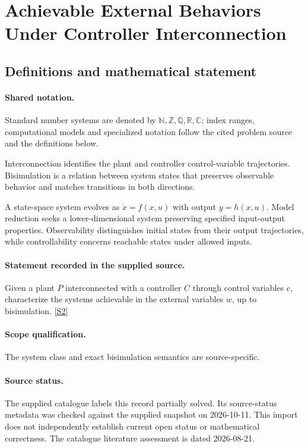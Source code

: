\documentclass[11pt]{article}
\newcommand{\sref}[2]{\hyperlink{source:#1:#2}{[S#2]}}
\begin{document}
\section{Achievable External Behaviors Under Controller Interconnection}\label{statement}

\subsection{Definitions and mathematical statement}

\paragraph{Shared notation.}Standard number systems are denoted by $\mathbb N,\mathbb Z,\mathbb Q,\mathbb R,\mathbb C$; index ranges, computational models and specialized notation follow the cited problem source and the definitions below.


Interconnection identifies the plant and controller control-variable trajectories. Bisimulation is a relation between system states that preserves observable behavior and matches transitions in both directions.

A state-space system evolves as $\dot x=f(x,u)$ with output $y=h(x,u)$. Model reduction seeks a lower-dimensional system preserving specified input-output properties. Observability distinguishes initial states from their output trajectories, while controllability concerns reachable states under allowed inputs.
\paragraph{Statement recorded in the supplied source.}
Given a plant $P$ interconnected with a controller $C$ through control variables $c$, characterize the systems achievable in the external variables $w$, up to bisimulation. \sref{statement}{2}
\paragraph{Scope qualification.}
The system class and exact bisimulation semantics are source-specific.
\paragraph{Source status.}
The supplied catalogue labels this record partially solved. Its source-status metadata was checked against the supplied snapshot on 2026-10-11. This import does not independently establish current open status or mathematical correctness. The catalogue literature assessment is dated 2026-08-21.
\end{document}
